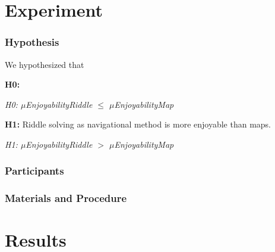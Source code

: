 \section{Experiment}


\subsubsection{Hypothesis}
We hypothesized that 

\textbf{H0:} 

\hspace{10 mm} \textit{H0: $\mu$EnjoyabilityRiddle $\leq$ $\mu$EnjoyabilityMap}

\textbf{H1:} Riddle solving as navigational method is more enjoyable than maps.

\hspace{10 mm} \textit{H1: $\mu$EnjoyabilityRiddle $>$ $\mu$EnjoyabilityMap}

\subsubsection{Participants}


\subsubsection{Materials and Procedure}

 
\section{Results}

